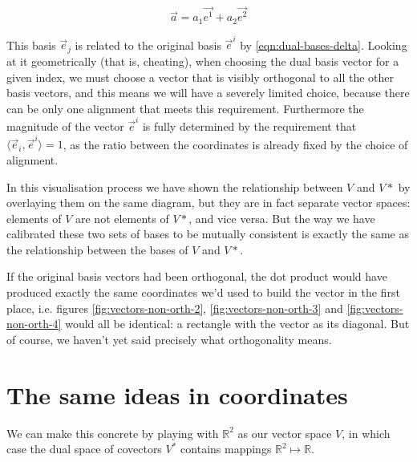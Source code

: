 $$
\vec{a} = a_1 \vec{e^1} + a_2 \vec{e^2}
$$

This basis $\vec{e}_j$ is related to the original basis $\vec{e}^i$ by \eqref{eqn:dual-bases-delta}. Looking at it geometrically (that is, cheating), when choosing the dual basis vector for a given index, we must choose a vector that is visibly orthogonal to all the other basis vectors, and this means we will have a severely limited choice, because there can be only one alignment that meets this requirement. Furthermore the magnitude of the vector $\vec{e}^i$ is fully determined by the requirement that $\langle \vec{e}_i, \vec{e}^i \rangle = 1$, as the ratio between the coordinates is already fixed by the choice of alignment.

In this visualisation process we have shown the relationship between $V$ and $V*$ by overlaying them on the same diagram, but they are in fact separate vector spaces: elements of $V$ are not elements of $V*$, and vice versa. But the way we have calibrated these two sets of bases to be mutually consistent is exactly the same as the relationship between the bases of $V$ and $V*$.

If the original basis vectors had been orthogonal, the dot product would have produced exactly the same coordinates we'd used to build the vector in the first place, i.e. figures \ref{fig:vectors-non-orth-2}, \ref{fig:vectors-non-orth-3} and \ref{fig:vectors-non-orth-4} would all be identical: a rectangle with the vector as its diagonal. But of course, we haven't yet said precisely what orthogonality means.

\section{The same ideas in coordinates}

We can make this concrete by playing with $\mathbb{R}^2$ as our vector space $V$, in which case the dual space of covectors $V^*$ contains mappings $\mathbb{R}^2 \mapsto \mathbb{R}$.

